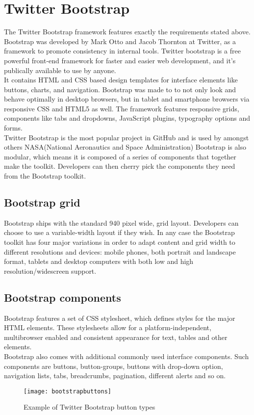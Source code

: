 \section{Twitter Bootstrap}
The Twitter Bootstrap framework\cite{twitterbootstrap} features exactly the requirements stated above. Bootstrap was developed by Mark Otto and Jacob Thornton at Twitter, as a framework to promote consistency in internal tools\cite{buildingbootstrap}. Twitter bootstrap is a free powerful front-end framework for faster and easier web development, and it's publically available to use by anyone.\\ It contains HTML and CSS based design templates for interface elements like buttons, charts, and navigation. Bootstrap was made to to not only look and behave optimally in desktop browsers, but in tablet and smartphone browsers via responsive CSS and HTML5 as well. The framework features responsive grids, components like tabs and dropdowns, JavaScript plugins, typography options and forms. \\
Twitter Bootstrap is the most popular project in GitHub and is used by amongst others NASA(National Aeronautics and Space Administration)\cite{nasa}
Bootstrap is also modular, which means it is composed of a series of components that together make the toolkit. Developers can then cherry pick the components they need from the Bootstrap toolkit. \\

\subsection{Bootstrap grid}
Bootstrap ships with the standard 940 pixel wide, grid layout. Developers can choose to use a variable-width layout if they wish. In any case the Bootstrap toolkit has four major variations in order to adapt content and grid width to different resolutions and devices: mobile phones, both portrait and landscape format, tablets and desktop computers with both low and high resolution/widescreen support.

\subsection{Bootstrap components}
Bootstrap features a set of CSS stylesheet, which defines styles for the major HTML elements. These stylesheets allow for a platform-independent, multibrowser enabled and consistent appearance for text, tables and other elements. \\
Bootstrap also comes with additional commonly used interface components. Such components are buttons, button-groups, buttons with drop-down option, navigation lists, tabs, breadcrumbs, pagination, different alerts and so on. 
\begin{figure}[h!]
\centering
	\texttt{[image: bootstrapbuttons]}
\caption{Example of Twitter Bootstrap button types}
\label{bootstrapbutton}
\end{figure}


